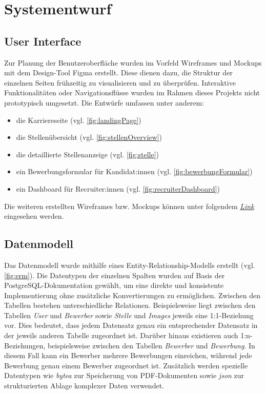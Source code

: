 \section{Systementwurf}
\subsection{User Interface}
Zur Planung der Benutzeroberfläche wurden im Vorfeld Wireframes und Mockups mit dem Design-Tool Figma erstellt. 
Diese dienen dazu, die Struktur der einzelnen Seiten frühzeitig zu visualisieren und zu überprüfen. 
Interaktive Funktionalitäten oder Navigationsflüsse wurden im Rahmen dieses Projekts nicht prototypisch umgesetzt. 
Die Entwürfe umfassen unter anderem:
\begin{itemize}
	\item die Karriereseite (vgl. \ref{fig:landingPage})
	\item die Stellenübersicht (vgl. \ref{fig:stellenOverview})
	\item die detaillierte Stellenanzeige (vgl. \ref{fig:stelle})
	\item ein Bewerbungsformular für Kandidat:innen (vgl. \ref{fig:bewerbungFormular})
	\item ein Dashboard für Recruiter:innen (vgl. \ref{fig:recruiterDashboard})
\end{itemize}
Die weiteren erstellten Wireframes bzw. Mockups können unter folgendem
\href{https://www.figma.com/design/0LDsbppkYlQgEbpulk5ud9/ATS-WebApp?node-id=20-46&t=cHVE2zw3fKD8hl14}{\textit{Link}} eingesehen werden.

\subsection{Datenmodell}
Das Datenmodell wurde mithilfe eines Entity-Relationship-Modells erstellt (vgl. \ref{fig:erm}). 
Die Datentypen der einzelnen Spalten wurden auf Basis der PostgreSQL-Dokumentation \parencite{postgreDt} gewählt, um eine direkte und konsistente Implementierung ohne zusätzliche Konvertierungen zu ermöglichen.
\newline
Zwischen den Tabellen bestehen unterschiedliche Relationen. 
Beispielsweise liegt zwischen den Tabellen \textit{User} und \textit{Bewerber} sowie \textit{Stelle} und \textit{Images} jeweils eine 1:1-Beziehung vor. 
Dies bedeutet, dass jedem Datensatz genau ein entsprechender Datensatz in der jeweils anderen Tabelle zugeordnet ist. 
Darüber hinaus existieren auch 1:n-Beziehungen, beispielsweise zwischen den Tabellen \textit{Bewerber} und \textit{Bewerbung}. 
In diesem Fall kann ein Bewerber mehrere Bewerbungen einreichen, während jede Bewerbung genau einem Bewerber zugeordnet ist.
\newline
Zusätzlich werden spezielle Datentypen wie \textit{bytea} zur Speicherung von PDF-Dokumenten sowie \textit{json} zur strukturierten Ablage komplexer Daten verwendet.

